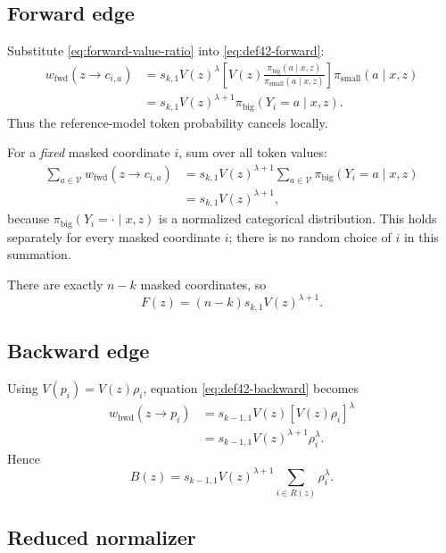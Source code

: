 \documentclass[11pt]{article}
\newcommand{\pb}{\pi_{\mathrm{big}}}
\newcommand{\ps}{\pi_{\mathrm{small}}}
\newcommand{\Vocab}{\mathcal{V}}
\newcommand{\R}{R}
\begin{document}
\subsection{Forward edge}

Substitute \eqref{eq:forward-value-ratio} into \eqref{eq:def42-forward}:
\begin{align}
w_{\mathrm{fwd}}(z\to c_{i,a})
&=
s_{k,1}V(z)^\lambda
\left[
V(z)\frac{\pb(a\mid x,z)}{\ps(a\mid x,z)}
\right]
\ps(a\mid x,z) \\
&=
\boxed{
s_{k,1}V(z)^{\lambda+1}\pb(Y_i=a\mid x,z)
}.
\label{eq:reduced-forward-edge}
\end{align}
Thus the reference-model token probability cancels locally.

For a \emph{fixed} masked coordinate $i$, sum over all token values:
\begin{align}
\sum_{a\in\Vocab} w_{\mathrm{fwd}}(z\to c_{i,a})
&=
s_{k,1}V(z)^{\lambda+1}
\sum_{a\in\Vocab}\pb(Y_i=a\mid x,z) \\
&=
s_{k,1}V(z)^{\lambda+1},
\end{align}
because $\pb(Y_i=\cdot\mid x,z)$ is a normalized categorical distribution. This holds separately for every masked coordinate $i$; there is no random choice of $i$ in this summation.

There are exactly $n-k$ masked coordinates, so
\begin{equation}
\boxed{
F(z)
=(n-k)s_{k,1}V(z)^{\lambda+1}
}.
\label{eq:forward-mass}
\end{equation}

\subsection{Backward edge}

Using $V(p_i)=V(z)\rho_i$, equation \eqref{eq:def42-backward} becomes
\begin{align}
w_{\mathrm{bwd}}(z\to p_i)
&=
s_{k-1,1}V(z)\left[V(z)\rho_i\right]^\lambda \\
&=
\boxed{
s_{k-1,1}V(z)^{\lambda+1}\rho_i^\lambda
}.
\label{eq:reduced-backward-edge}
\end{align}
Hence
\begin{equation}
\boxed{
B(z)
=
s_{k-1,1}V(z)^{\lambda+1}
\sum_{i\in\R(z)}\rho_i^\lambda
}.
\label{eq:backward-mass}
\end{equation}

\subsection{Reduced normalizer}
\end{document}
